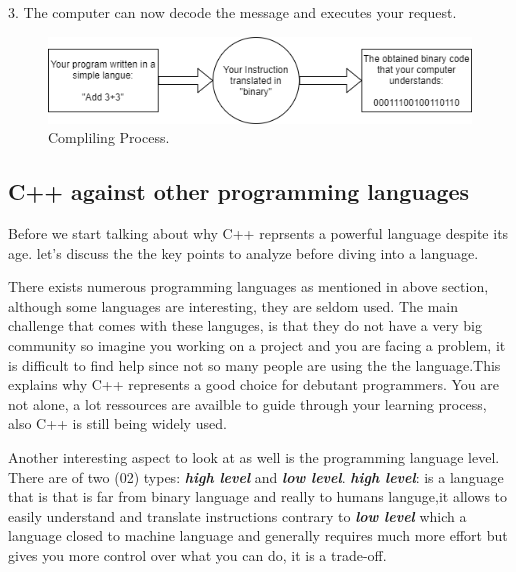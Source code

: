 \documentclass[11pt, a4paper]{article}
\begin{document}
3. The computer can now decode the message and executes your request.

\begin{figure}[!ht]
\includegraphics[width = \linewidth]{diagrams/compling.png}
\caption{Compliling Process.}
\label{fig:Compliling Process}
\end{figure}

\subsection{C++ against other programming languages}
Before we start talking about why C++ reprsents a powerful language despite its age. let's discuss the
the key points to analyze before diving into a language.

There exists numerous programming languages as mentioned in above section, although some languages are interesting, 
they are seldom used. The main challenge that comes with these languges, is that they do not have a very big community 
so imagine you working on a project and you are facing a problem, it is difficult to find help since not so many people 
are using the the language.This explains why C++ represents a good choice for debutant programmers. You are not alone, a lot
ressources are availble to guide through your learning process, also C++ is still being widely used.

Another interesting aspect to look at as well is the programming language level. There are of two (02)
types: \textbf{\textit{{high level}}} and \textbf{\textit{{low level}}}.
\newline
\textbf{\textit{{high level}}}: is a language that is that is far from binary language and really
to humans languge,it allows to easily understand and translate instructions contrary to \textbf{\textit{{low level}}}
which a language closed to machine language and generally requires much more effort but gives you more 
control over what you can do, it is a trade-off.
\end{document}
